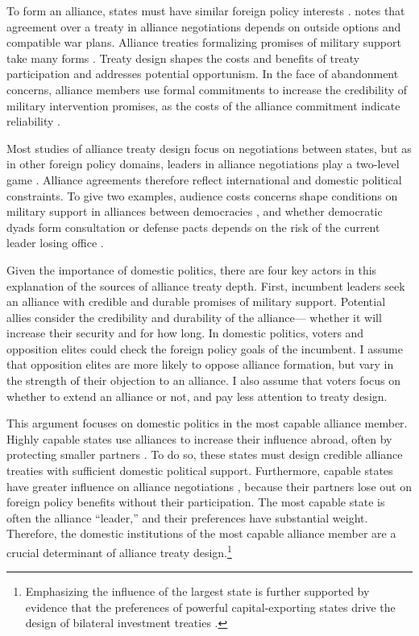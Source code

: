 \documentclass[12pt]{article}
\begin{document}
To form an alliance, states must have similar foreign policy interests \citep{Morrow1991, Smith1995, FordhamPoast2014}. 
\citet{Poast2019a} notes that agreement over a treaty in alliance negotiations depends on outside options and compatible war plans. 
Alliance treaties formalizing promises of military support take many forms \citep{Leedsetal2002, BensonClinton2016}. 
Treaty design shapes the costs and benefits of treaty participation and addresses potential opportunism.  
In the face of abandonment concerns, alliance members use formal commitments to increase the credibility of military intervention promises, as the costs of the alliance commitment indicate reliability \citep{Morrow2000}.


Most studies of alliance treaty design focus on negotiations between states, but as in other foreign policy domains, leaders in alliance negotiations play a two-level game \citep{Putnam1988}. 
Alliance agreements therefore reflect international and domestic political constraints. 
To give two examples, audience costs concerns shape conditions on military support in alliances between democracies \citep{Chibaetal2015, FjelstulReiter2019}, and whether democratic dyads form consultation or defense pacts depends on the risk of the current leader losing office \citep{Mattes2012a}. 


Given the importance of domestic politics, there are four key actors in this explanation of the sources of alliance treaty depth. 
First, incumbent leaders seek an alliance with credible and durable promises of military support. 
Potential allies consider the credibility and durability of the alliance--- whether it will increase their security and for how long. 
In domestic politics, voters and opposition elites could check the foreign policy goals of the incumbent. 
I assume that opposition elites are more likely to oppose alliance formation, but vary in the strength of their objection to an alliance. 
I also assume that voters focus on whether to extend an alliance or not, and pay less attention to treaty design.


This argument focuses on domestic politics in the most capable alliance member. 
Highly capable states use alliances to increase their influence abroad, often by protecting smaller partners \citep{Morrow1994}. 
To do so, these states must design credible alliance treaties with sufficient domestic political support.
Furthermore, capable states have greater influence on alliance negotiations \citep{Mattes2012}, because their partners lose out on foreign policy benefits without their participation.
The most capable state is often the alliance ``leader,'' and their preferences have substantial weight. 
Therefore, the domestic institutions of the most capable alliance member are a crucial determinant of alliance treaty design.\footnote{Emphasizing the influence of the largest state is further supported by evidence that the preferences of powerful capital-exporting states drive the design of bilateral investment treaties \citep{AlleePeinhardt2014}.} 
\end{document}
